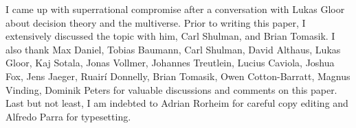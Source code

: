I came up with superrational compromise after a conversation with Lukas
Gloor about decision theory and the multiverse. Prior to writing this
paper, I extensively discussed the topic with him, Carl Shulman, and
Brian Tomasik. I also thank Max Daniel, Tobias Baumann, Carl Shulman,
David Althaus, Lukas Gloor, Kaj Sotala, Jonas Vollmer, Johannes
Treutlein, Lucius Caviola, Joshua Fox, Jens Jaeger, Ruairí Donnelly,
Brian Tomasik, Owen Cotton-Barratt, Magnus Vinding, Dominik Peters for
valuable discussions and comments on this paper. Last but not least, I
am indebted to Adrian Rorheim for careful copy editing and Alfredo Parra for typesetting.
